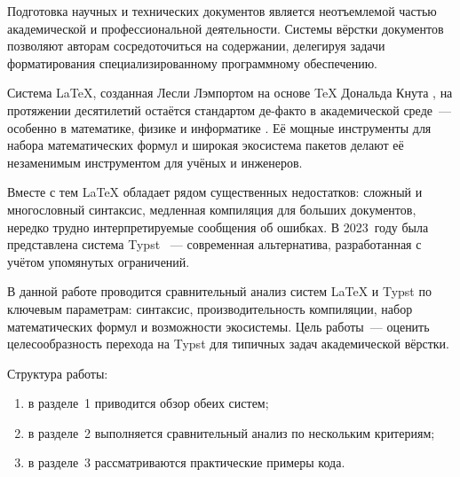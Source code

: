 Подготовка научных и технических документов является неотъемлемой частью академической и профессиональной деятельности. Системы вёрстки документов позволяют авторам сосредоточиться на содержании, делегируя задачи форматирования специализированному программному обеспечению.

Система {\LaTeX}, созданная Лесли Лэмпортом на основе {\TeX} Дональда Кнута \cite{knuth1984texbook}, на протяжении десятилетий остаётся стандартом де-факто в академической среде~--- особенно в математике, физике и информатике \cite{latex-project}. Её мощные инструменты для набора математических формул и широкая экосистема пакетов делают её незаменимым инструментом для учёных и инженеров.

Вместе с тем {\LaTeX} обладает рядом существенных недостатков: сложный и многословный синтаксис, медленная компиляция для больших документов, нередко трудно интерпретируемые сообщения об ошибках. В 2023~году была представлена система Typst \cite{typst-github}~--- современная альтернатива, разработанная с учётом упомянутых ограничений.

В данной работе проводится сравнительный анализ систем {\LaTeX} и Typst по ключевым параметрам: синтаксис, производительность компиляции, набор математических формул и возможности экосистемы. Цель работы~--- оценить целесообразность перехода на Typst для типичных задач академической вёрстки.

Структура работы:
\begin{enumerate}
    \item в разделе~1 приводится обзор обеих систем;
    \item в разделе~2 выполняется сравнительный анализ по нескольким критериям;
    \item в разделе~3 рассматриваются практические примеры кода.
\end{enumerate}
